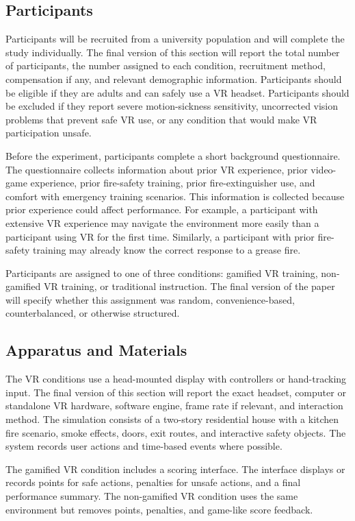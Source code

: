 \documentclass[manuscript, review]{acmart}
\begin{document}
{\subsection{Participants}

Participants will be recruited from a university population and will complete the study individually. The final version of this section will report the total number of participants, the number assigned to each condition, recruitment method, compensation if any, and relevant demographic information. Participants should be eligible if they are adults and can safely use a VR headset. Participants should be excluded if they report severe motion-sickness sensitivity, uncorrected vision problems that prevent safe VR use, or any condition that would make VR participation unsafe.

Before the experiment, participants complete a short background questionnaire. The questionnaire collects information about prior VR experience, prior video-game experience, prior fire-safety training, prior fire-extinguisher use, and comfort with emergency training scenarios. This information is collected because prior experience could affect performance. For example, a participant with extensive VR experience may navigate the environment more easily than a participant using VR for the first time. Similarly, a participant with prior fire-safety training may already know the correct response to a grease fire.

Participants are assigned to one of three conditions: gamified VR training, non-gamified VR training, or traditional instruction. The final version of the paper will specify whether this assignment was random, convenience-based, counterbalanced, or otherwise structured.

\subsection{Apparatus and Materials}

The VR conditions use a head-mounted display with controllers or hand-tracking input. The final version of this section will report the exact headset, computer or standalone VR hardware, software engine, frame rate if relevant, and interaction method. The simulation consists of a two-story residential house with a kitchen fire scenario, smoke effects, doors, exit routes, and interactive safety objects. The system records user actions and time-based events where possible.

The gamified VR condition includes a scoring interface. The interface displays or records points for safe actions, penalties for unsafe actions, and a final performance summary. The non-gamified VR condition uses the same environment but removes points, penalties, and game-like score feedback.

}
\end{document}
